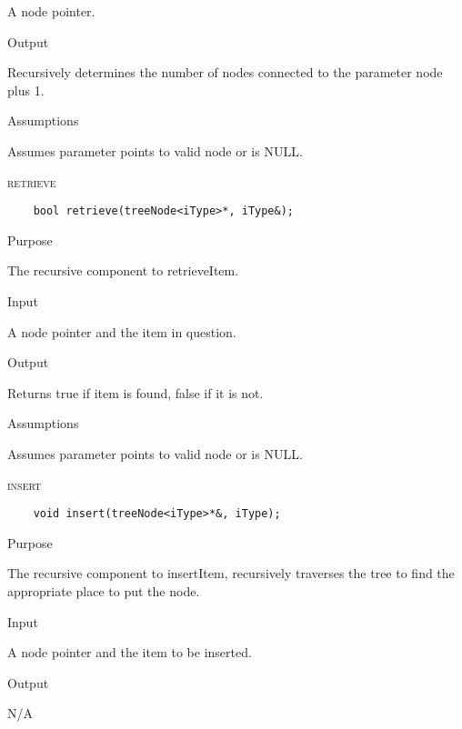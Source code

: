 \documentclass[pdftex, 12pt]{article}
\begin{document}
\begin{description}
\begin{description}
				A node pointer.

			\item{Output}

				Recursively determines the number of nodes connected to the parameter node plus 1.

			\item{Assumptions}

				Assumes parameter points to valid node or is NULL.

		\end{description}
	\item{\textsc{retrieve}}
\begin{lstlisting}
	bool retrieve(treeNode<iType>*, iType&);
\end{lstlisting}
		\begin{description}

			\item{Purpose}

				The recursive component to retrieveItem.

			\item{Input}

				A node pointer and the item in question.

			\item{Output}

				Returns true if item is found, false if it is not.

			\item{Assumptions}

				Assumes parameter points to valid node or is NULL.

		\end{description}
	\item{\textsc{insert}}
\begin{lstlisting}
	void insert(treeNode<iType>*&, iType);
\end{lstlisting}
		\begin{description}

			\item{Purpose}

				The recursive component to insertItem, recursively traverses the tree to find the appropriate place to
				put the node.

			\item{Input}

				A node pointer and the item to be inserted.
				
			\item{Output}

				N/A


\end{description}
\end{description}
\end{document}
